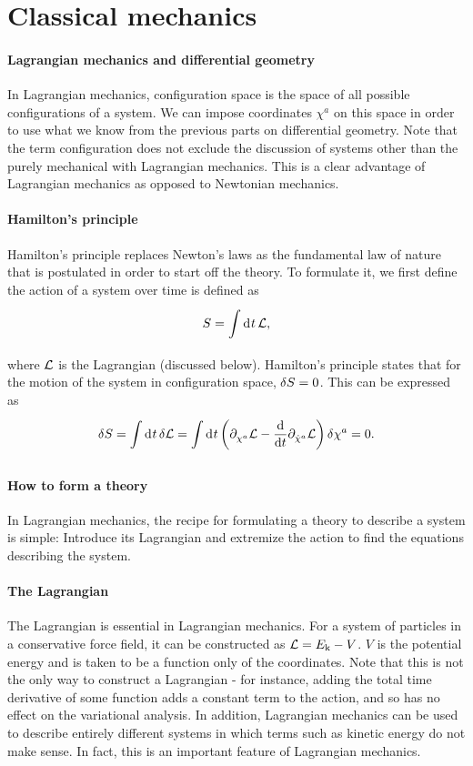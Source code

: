 \section{Classical mechanics}

\paragraph{Lagrangian mechanics and differential geometry}
In Lagrangian mechanics, configuration space is the space of all possible configurations of a system. We can impose coordinates $\chi^{a}$ on this space in order to use what we know from the previous parts on differential geometry. Note that the term configuration does not exclude the discussion of systems other than the purely mechanical with Lagrangian mechanics. This is a clear advantage of Lagrangian mechanics as opposed to Newtonian mechanics.

\paragraph{Hamilton's principle}
Hamilton's principle replaces Newton's laws as the fundamental law of nature that is postulated in order to start off the theory. To formulate it, we first define the action of a system over time is defined as
\begin{align*}
	S = \int\limits_{}^{}\dd[]{t}\mathcal{L},
\end{align*}
where $\mathcal{L}$ is the Lagrangian (discussed below). Hamilton's principle states that for the motion of the system in configuration space, $\delta S = 0$. This can be expressed as
\begin{align*}
	\delta S = \int\limits_{}^{}\dd[]{t}\delta \mathcal{L} = \int\limits_{}^{}\dd[]{t}\left(\partial^{}_{\chi^{a}}\mathcal{L} - \dv{t}\partial^{}_{\dot{\chi}^{a}}\mathcal{L}\right)\delta \chi^{a} = 0.
\end{align*}

\paragraph{How to form a theory}
In Lagrangian mechanics, the recipe for formulating a theory to describe a system is simple: Introduce its Lagrangian and extremize the action to find the equations describing the system.

\paragraph{The Lagrangian}
The Lagrangian is essential in Lagrangian mechanics. For a system of particles in a conservative force field, it can be constructed as $\mathcal{L} = E_{\text{k}} - V$. $V$ is the potential energy and is taken to be a function only of the coordinates. Note that this is not the only way to construct a Lagrangian - for instance, adding the total time derivative of some function adds a constant term to the action, and so has no effect on the variational analysis. In addition, Lagrangian mechanics can be used to describe entirely different systems in which terms such as kinetic energy do not make sense. In fact, this is an important feature of Lagrangian mechanics.


